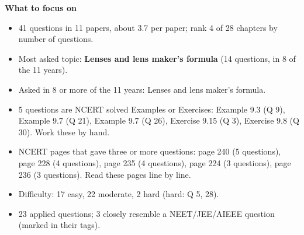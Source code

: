 \begin{minipage}[t]{0.63\linewidth}{\small\textbf{\color{crimson}What to focus on}\par\smallskip
\begin{itemize}[leftmargin=1.1em,itemsep=1pt,topsep=0pt]
\item 41 questions in 11 papers, about 3.7 per paper; rank 4 of 28 chapters by number of questions.
\item Most asked topic: \textbf{Lenses and lens maker's formula} (14 questions, in 8 of the 11 years).
\item Asked in 8 or more of the 11 years: Lenses and lens maker's formula.
\item 5 questions are NCERT solved Examples or Exercises: Example 9.3 (Q 9), Example 9.7 (Q 21), Example 9.7 (Q 26), Exercise 9.15 (Q 3), Exercise 9.8 (Q 30). Work these by hand.
\item NCERT pages that gave three or more questions: page 240 (5 questions), page 228 (4 questions), page 235 (4 questions), page 224 (3 questions), page 236 (3 questions). Read these pages line by line.
\item Difficulty: 17 easy, 22 moderate, 2 hard (hard: Q 5, 28).
\item 23 applied questions; 3 closely resemble a NEET/JEE/AIEEE question (marked in their tags).
\end{itemize}}\end{minipage}\par
{}
